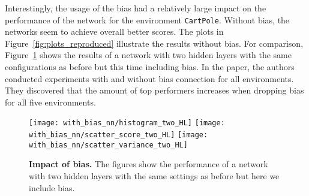 Interestingly, the usage of the bias had a relatively large impact on the performance of the network for the environment \verb|CartPole|. Without bias, the networks seem to achieve overall better scores. The plots in Figure~\ref{fig:plots_reproduced} illustrate the results without bias. For comparison, Figure~\ref{fig:comparison_bias} shows the results of a network with two hidden layers with the same configurations as before but this time including bias. In the paper, the authors conducted experiments with and without bias connection for all environments. They discovered that the amount of top performers increases when dropping bias for all five environments.
\begin{figure}[ht]
\centering
\texttt{[image: with\_bias\_nn/histogram\_two\_HL]}
\texttt{[image: with\_bias\_nn/scatter\_score\_two\_HL]}
\texttt{[image: with\_bias\_nn/scatter\_variance\_two\_HL]}
\caption[Impact of Bias]{
  \textbf{Impact of bias.}
  The figures show the performance of a network with two hidden layers with the same settings as before but here we include bias.
}
\label{fig:comparison_bias}
\end{figure}


